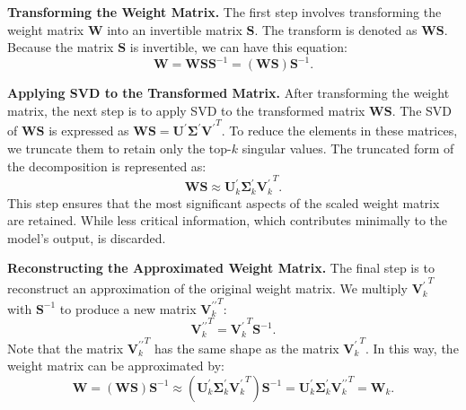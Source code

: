 \noindent\textbf{Transforming the Weight Matrix.} The first step involves transforming the weight matrix $\mathbf{W}$ into an invertible matrix $\mathbf{S}$. 
The transform is denoted as $\mathbf{WS}$.
Because the matrix $\mathbf{S}$ is invertible, we can have this equation:
\begin{equation}
    \mathbf{W} = \mathbf{WSS}^{-1} = (\mathbf{WS})\mathbf{S}^{-1}.
\end{equation}

\noindent\textbf{Applying SVD to the Transformed Matrix.} After transforming the weight matrix, the next step is to apply SVD to the transformed matrix $\mathbf{WS}$. The SVD of $\mathbf{WS}$ is expressed as $\mathbf{WS} = \mathbf{U}^{\prime}\mathbf{\Sigma}^{\prime}{\mathbf{V}^{\prime}}^{T}$. 
To reduce the elements in these matrices, we truncate them to retain only the top-$k$ singular values. The truncated form of the decomposition is represented as:
\begin{equation}
    \mathbf{WS} \approx \mathbf{U}_k^{\prime}\mathbf{\Sigma}_k^{\prime}{\mathbf{V}_k^{\prime}}^{T}.
\end{equation}
This step ensures that the most significant aspects of the scaled weight matrix are retained. While less critical information, which contributes minimally to the model's output, is discarded. 

\textbf{Reconstructing the Approximated Weight Matrix.} The final step is to reconstruct an approximation of the original weight matrix. 
We multiply ${\mathbf{V}_k^{\prime}}^T$ with $\mathbf{S}^{-1}$ to produce a new matrix ${\mathbf{V}_k^{\prime\prime}}^T$:
\begin{equation}
    {\mathbf{V}_k^{\prime\prime}}^T = {\mathbf{V}_k^{\prime}}^T \mathbf{S}^{-1}.
\end{equation}
Note that the matrix ${\mathbf{V}_k^{\prime\prime}}^T$ has the same shape as the matrix ${\mathbf{V}_k^{\prime}}^T$.
In this way, the weight matrix can be approximated by:
\begin{equation}
    \mathbf{W} = (\mathbf{WS})\mathbf{S}^{-1}
    \approx (\mathbf{U}_k^{\prime}\mathbf{\Sigma}_k^{\prime}{\mathbf{V}_k^{\prime}}^{T}) \mathbf{S}^{-1}  = \mathbf{U}_k^{\prime}\mathbf{\Sigma}_k^{\prime}{\mathbf{V}_k^{\prime\prime}}^T
    = \mathbf{W}_k.
\end{equation}

